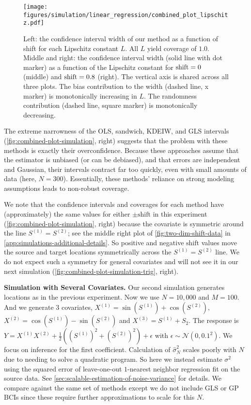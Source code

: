 \begin{figure*}
\texttt{[image: figures/simulation/linear\_regression/combined\_plot\_lipschitz.pdf]}
    \caption{Left: the confidence interval width of our method as a function of shift for each Lipschitz constant $L$. All $L$ yield coverage of $1.0$. Middle and right: the confidence interval width (solid line with dot marker) as a function of the Lipschitz constant for $\mathrm{shift}=0$ (middle) and $\mathrm{shift}=0.8$ (right). The vertical axis is shared across all three plots. The bias contribution to the width (dashed line, x marker) is monotonically increasing in $L$. The randomness contribution (dashed line, square marker) is monotonically decreasing.}\label{fig:combined-plot-simulation-lipschitz}
\end{figure*}

The extreme narrowness of the OLS, sandwich, KDEIW, and GLS intervals (\cref{fig:combined-plot-simulation}, right) suggests that the problem with these methods is exactly their overconfidence. Because these approaches assume that the estimator is unbiased (or can be debiased), and that errors are independent and Gaussian, their intervals contract far too quickly, even with small amounts of data (here, $N=300$). Essentially, these methods' reliance on strong modeling assumptions leads to non-robust coverage.

We note that the confidence intervals and coverages for each method have (approximately) the same values for either $\pm \mathrm{shift}$ in this experiment (\cref{fig:combined-plot-simulation}, right) because the covariate is symmetric around the line $S^{(1)} = S^{(2)}$; see the middle right plot of \cref{fig:two-dim-shift-data} in \cref{app:simulations-additional-details}. So positive and negative $\mathrm{shift}$ values move the source and target locations symmetrically across the $S^{(1)} = S^{(2)}$ line. We do not expect such a symmetry for general covariates and will not see it in our next simulation (\cref{fig:combined-plot-simulation-trig}, right).


\textbf{Simulation with Several Covariates.} Our second simulation generates locations as in the previous experiment. Now we use $N = 10{,}000$ and $M=100$. And we generate 3 covariates, $X^{(1)} = \sin(S^{(1)}) + \cos(S^{(2)}),$ $X^{(2)} = \cos(S^{(1)}) - \sin(S^{(2)})$ and $X^{(3)} = S^{(1)} + S_2$. The response is $Y = X^{(1)}X^{(2)} + \frac{1}{2}((S^{(1)})^2 + (S^{(2)})^2) + \epsilon$ with $\epsilon \sim \mathcal{N}(0, 0.1^2)$. We focus on inference for the first coefficient. Calculation of $\hat{\sigma}_N^2$ scales poorly with $N$ due to needing to solve a quadratic program. So here we instead estimate $\sigma^2$ using the squared error of leave-one-out $1$-nearest neighbor regression fit on the source data. See \cref{sec:scalable-estimation-of-noise-variance} for details.
We compare against the same set of methods except we do not include GLS or GP BCIs since these require further approximations to scale for this $N$.

